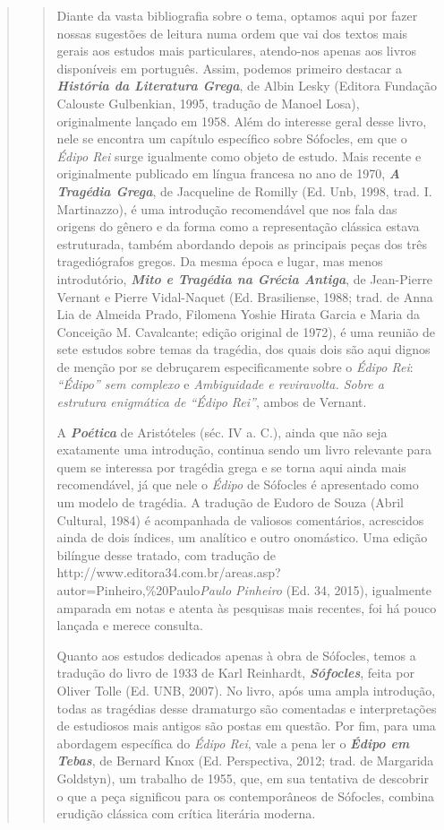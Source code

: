 \begin{verse}
\begin{verse}
Diante da vasta bibliografia sobre o tema, optamos aqui por fazer nossas
sugestões de leitura numa ordem que vai dos textos mais gerais aos
estudos mais particulares, atendo-nos apenas aos livros disponíveis em
português. Assim, podemos primeiro destacar a \emph{\textbf{História da
Literatura Grega}}, de Albin Lesky (Editora Fundação Calouste
Gulbenkian, 1995, tradução de Manoel Losa), originalmente lançado em
1958. Além do interesse geral desse livro, nele se encontra um capítulo
específico sobre Sófocles, em que o \emph{Édipo Rei} surge igualmente
como objeto de estudo. Mais recente e originalmente publicado em língua
francesa no ano de 1970, \emph{\textbf{A Tragédia Grega}}, de Jacqueline
de Romilly (Ed. Unb, 1998, trad. I. Martinazzo), é uma introdução
recomendável que nos fala das origens do gênero e da forma como a
representação clássica estava estruturada, também abordando depois as
principais peças dos três tragediógrafos gregos. Da mesma época e lugar,
mas menos introdutório, \emph{\textbf{Mito e Tragédia na Grécia
Antiga}}, de Jean-Pierre Vernant e Pierre Vidal-Naquet (Ed. Brasiliense,
1988; trad. de Anna Lia de Almeida Prado, Filomena Yoshie Hirata Garcia
e Maria da Conceição M. Cavalcante; edição original de 1972), é uma
reunião de sete estudos sobre temas da tragédia, dos quais dois são aqui
dignos de menção por se debruçarem especificamente sobre o \emph{Édipo
Rei}: \emph{``Édipo'' sem complexo} e \emph{Ambiguidade e reviravolta.
Sobre a estrutura enigmática de ``Édipo Rei''}, ambos de Vernant.

A \emph{\textbf{Poética}} de Aristóteles (séc. IV a. C.), ainda que não
seja exatamente uma introdução, continua sendo um livro relevante para
quem se interessa por tragédia grega e se torna aqui ainda mais
recomendável, já que nele o \emph{Édipo} de Sófocles é apresentado como
um modelo de tragédia. A tradução de Eudoro de Souza (Abril Cultural,
1984) é acompanhada de valiosos comentários, acrescidos ainda de dois
índices, um analítico e outro onomástico. Uma edição bilíngue desse
tratado, com tradução
de {http://www.editora34.com.br/areas.asp?autor=Pinheiro,\%20Paulo}{\emph{Paulo
Pinheiro}} (Ed. 34, 2015), igualmente amparada em notas e atenta às
pesquisas mais recentes, foi há pouco lançada e merece consulta.

Quanto aos estudos dedicados apenas à obra de Sófocles, temos a tradução
do livro de 1933 de Karl Reinhardt, \emph{\textbf{Sófocles}}, feita por
Oliver Tolle (Ed. UNB, 2007). No livro, após uma ampla introdução, todas
as tragédias desse dramaturgo são comentadas e interpretações de
estudiosos mais antigos são postas em questão. Por fim, para uma
abordagem específica do \emph{Édipo Rei}, vale a pena ler o
\emph{\textbf{Édipo em Tebas}}, de Bernard Knox (Ed. Perspectiva, 2012;
trad. de Margarida Goldstyn), um trabalho de 1955, que, em sua tentativa
de descobrir o que a peça significou para os contemporâneos de Sófocles,
combina erudição clássica com crítica literária moderna.


\end{verse}
\end{verse}
